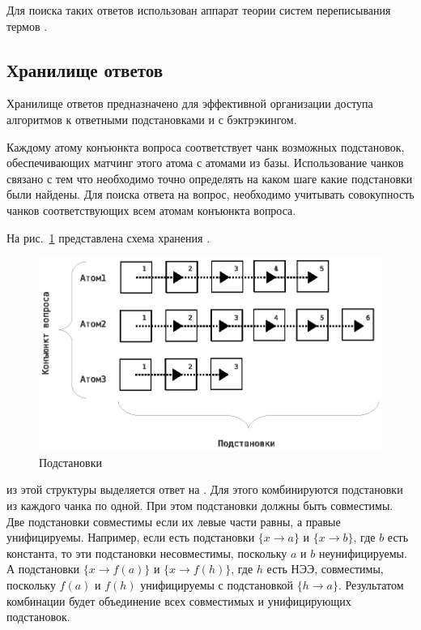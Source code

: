 Для поиска таких ответов использован аппарат теории систем переписывания термов \cite{Nipkow}.

\subsection{Хранилище ответов}
Хранилище ответов предназначено для эффективной организации доступа алгоритмов к ответными подстановками и  с бэктрэкингом.

Каждому атому конъюнкта вопроса соответствует чанк возможных подстановок, обеспечивающих матчинг этого атома с атомами из базы. Использование чанков связано с тем что необходимо точно определять на каком шаге какие подстановки были найдены. Для поиска ответа на вопрос, необходимо учитывать  совокупность чанков соответствующих всем атомам конъюнкта вопроса.

На рис.~\ref{fig:anbase} представлена схема хранения .

\begin{figure}[h]
	\centering
	\includegraphics[width=0.6\linewidth]{pics/AnBase.eps}
	\caption{Подстановки}
	\label{fig:anbase}
\end{figure}

 из этой структуры выделяется ответ на . Для этого комбинируются подстановки из каждого чанка по одной. При этом подстановки должны быть совместимы. Две подстановки совместимы если их левые части равны, а правые унифицируемы. Например, если есть подстановки $\{x \rightarrow a\}$ и $\{x \rightarrow b\}$, где $b$ есть константа, то эти подстановки несовместимы, поскольку $a$ и $b$ неунифицируемы. А подстановки $\{x \rightarrow f(a)\}$ и $\{x \rightarrow f(h)\}$, где $h$ есть НЭЭ, совместимы, поскольку $f(a)$ и $f(h)$ унифицируемы с подстановкой $\{h \rightarrow a\}$. Результатом комбинации будет объединение всех совместимых и унифицирующих подстановок.

